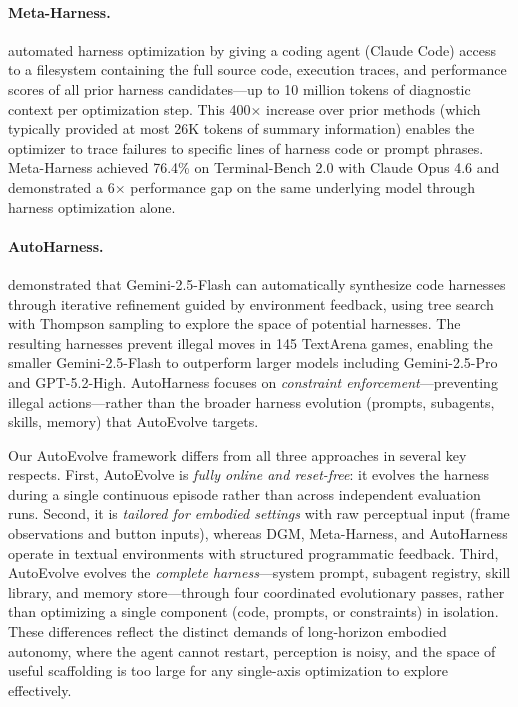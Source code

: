 \paragraph{Meta-Harness.} \citet{lee2026metaharness} automated harness optimization by giving a coding agent (Claude Code) access to a filesystem containing the full source code, execution traces, and performance scores of all prior harness candidates---up to 10 million tokens of diagnostic context per optimization step. This 400$\times$ increase over prior methods (which typically provided at most 26K tokens of summary information) enables the optimizer to trace failures to specific lines of harness code or prompt phrases. Meta-Harness achieved 76.4\% on Terminal-Bench 2.0 with Claude Opus 4.6 and demonstrated a 6$\times$ performance gap on the same underlying model through harness optimization alone.

\paragraph{AutoHarness.} \citet{lou2026autoharness} demonstrated that Gemini-2.5-Flash can automatically synthesize code harnesses through iterative refinement guided by environment feedback, using tree search with Thompson sampling to explore the space of potential harnesses. The resulting harnesses prevent illegal moves in 145 TextArena games, enabling the smaller Gemini-2.5-Flash to outperform larger models including Gemini-2.5-Pro and GPT-5.2-High. AutoHarness focuses on \emph{constraint enforcement}---preventing illegal actions---rather than the broader harness evolution (prompts, subagents, skills, memory) that AutoEvolve targets.

Our AutoEvolve framework differs from all three approaches in several key respects. First, AutoEvolve is \emph{fully online and reset-free}: it evolves the harness during a single continuous episode rather than across independent evaluation runs. Second, it is \emph{tailored for embodied settings} with raw perceptual input (frame observations and button inputs), whereas DGM, Meta-Harness, and AutoHarness operate in textual environments with structured programmatic feedback. Third, AutoEvolve evolves the \emph{complete harness}---system prompt, subagent registry, skill library, and memory store---through four coordinated evolutionary passes, rather than optimizing a single component (code, prompts, or constraints) in isolation. These differences reflect the distinct demands of long-horizon embodied autonomy, where the agent cannot restart, perception is noisy, and the space of useful scaffolding is too large for any single-axis optimization to explore effectively.
